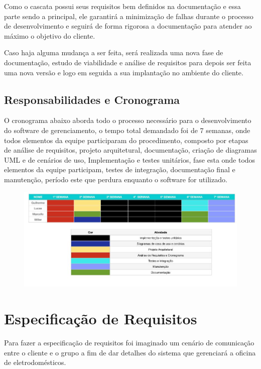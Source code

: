 \documentclass[a4paper,10pt]{article}
\begin{document}
Como o cascata possui seus requisitos bem definidos na documentação e essa parte sendo a principal, ele garantirá a minimização de falhas durante o processo de desenvolvimento e seguirá de forma rigorosa a documentação para atender ao máximo o objetivo do cliente. 

Caso haja alguma mudança a ser feita, será realizada uma nova fase de documentação, estudo de viabilidade e  análise de requisitos para depois ser feita uma nova versão e logo em seguida a sua implantação no ambiente do cliente.

\subsection{Responsabilidades e Cronograma}

O cronograma abaixo aborda todo o processo necessário para o desenvolvimento do software de gerenciamento, o tempo total demandado foi de 7 semanas, onde todos elementos da equipe participaram do procedimento, composto por  etapas de análise de requisitos, projeto arquitetural, documentação, criação de diagramas UML e de cenários de uso, Implementação e testes unitários, fase esta onde todos elementos da equipe participam, testes de integração, documentação final e manutenção, período este que perdura enquanto o software for utilizado.

\begin{figure}[H]
\centering
\includegraphics[width=1\textwidth]{pic/cronograma.jpeg}
\end{figure}

\section{Especificação de Requisitos}

Para fazer a especificação de requisitos foi imaginado um cenário de comunicação entre o cliente e o grupo a fim de dar detalhes do sistema que gerenciará a oficina de eletrodomésticos.	
\end{document}
